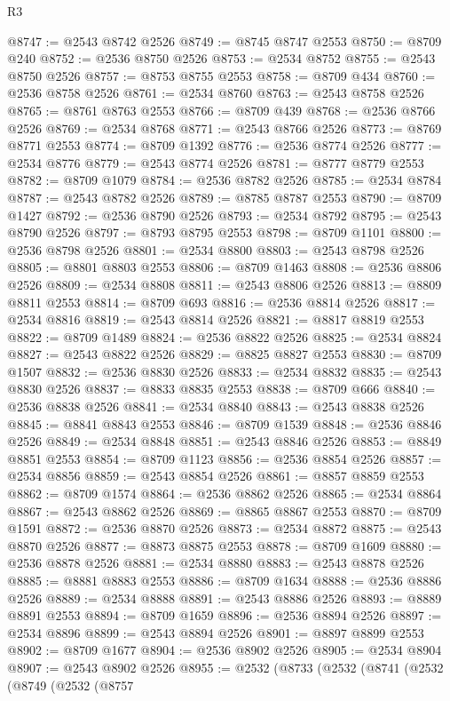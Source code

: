 \begin{lexlean}{R3}
\begin{coremodule}
@8747 := @2543 @8742 @2526
@8749 := @8745 @8747 @2553
@8750 := @8709 @240
@8752 := @2536 @8750 @2526
@8753 := @2534 @8752
@8755 := @2543 @8750 @2526
@8757 := @8753 @8755 @2553
@8758 := @8709 @434
@8760 := @2536 @8758 @2526
@8761 := @2534 @8760
@8763 := @2543 @8758 @2526
@8765 := @8761 @8763 @2553
@8766 := @8709 @439
@8768 := @2536 @8766 @2526
@8769 := @2534 @8768
@8771 := @2543 @8766 @2526
@8773 := @8769 @8771 @2553
@8774 := @8709 @1392
@8776 := @2536 @8774 @2526
@8777 := @2534 @8776
@8779 := @2543 @8774 @2526
@8781 := @8777 @8779 @2553
@8782 := @8709 @1079
@8784 := @2536 @8782 @2526
@8785 := @2534 @8784
@8787 := @2543 @8782 @2526
@8789 := @8785 @8787 @2553
@8790 := @8709 @1427
@8792 := @2536 @8790 @2526
@8793 := @2534 @8792
@8795 := @2543 @8790 @2526
@8797 := @8793 @8795 @2553
@8798 := @8709 @1101
@8800 := @2536 @8798 @2526
@8801 := @2534 @8800
@8803 := @2543 @8798 @2526
@8805 := @8801 @8803 @2553
@8806 := @8709 @1463
@8808 := @2536 @8806 @2526
@8809 := @2534 @8808
@8811 := @2543 @8806 @2526
@8813 := @8809 @8811 @2553
@8814 := @8709 @693
@8816 := @2536 @8814 @2526
@8817 := @2534 @8816
@8819 := @2543 @8814 @2526
@8821 := @8817 @8819 @2553
@8822 := @8709 @1489
@8824 := @2536 @8822 @2526
@8825 := @2534 @8824
@8827 := @2543 @8822 @2526
@8829 := @8825 @8827 @2553
@8830 := @8709 @1507
@8832 := @2536 @8830 @2526
@8833 := @2534 @8832
@8835 := @2543 @8830 @2526
@8837 := @8833 @8835 @2553
@8838 := @8709 @666
@8840 := @2536 @8838 @2526
@8841 := @2534 @8840
@8843 := @2543 @8838 @2526
@8845 := @8841 @8843 @2553
@8846 := @8709 @1539
@8848 := @2536 @8846 @2526
@8849 := @2534 @8848
@8851 := @2543 @8846 @2526
@8853 := @8849 @8851 @2553
@8854 := @8709 @1123
@8856 := @2536 @8854 @2526
@8857 := @2534 @8856
@8859 := @2543 @8854 @2526
@8861 := @8857 @8859 @2553
@8862 := @8709 @1574
@8864 := @2536 @8862 @2526
@8865 := @2534 @8864
@8867 := @2543 @8862 @2526
@8869 := @8865 @8867 @2553
@8870 := @8709 @1591
@8872 := @2536 @8870 @2526
@8873 := @2534 @8872
@8875 := @2543 @8870 @2526
@8877 := @8873 @8875 @2553
@8878 := @8709 @1609
@8880 := @2536 @8878 @2526
@8881 := @2534 @8880
@8883 := @2543 @8878 @2526
@8885 := @8881 @8883 @2553
@8886 := @8709 @1634
@8888 := @2536 @8886 @2526
@8889 := @2534 @8888
@8891 := @2543 @8886 @2526
@8893 := @8889 @8891 @2553
@8894 := @8709 @1659
@8896 := @2536 @8894 @2526
@8897 := @2534 @8896
@8899 := @2543 @8894 @2526
@8901 := @8897 @8899 @2553
@8902 := @8709 @1677
@8904 := @2536 @8902 @2526
@8905 := @2534 @8904
@8907 := @2543 @8902 @2526
@8955 := @2532
    (@8733
      (@2532
        (@8741
          (@2532
            (@8749
              (@2532
                (@8757

\end{coremodule}
\end{lexlean}
